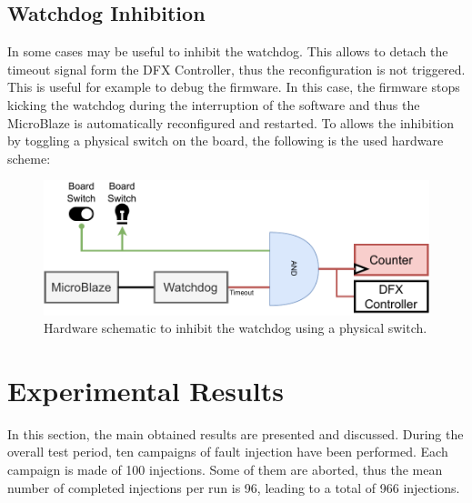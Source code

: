 \subsection{Watchdog Inhibition}
In some cases may be useful to inhibit the watchdog. This allows to detach the timeout signal form the DFX Controller, thus the reconfiguration is not triggered. This is useful for example to debug the firmware. In this case, the firmware stops kicking the watchdog during the interruption of the software and thus the MicroBlaze is automatically reconfigured and restarted. To allows the inhibition by toggling a physical switch on the board, the following is the used hardware scheme:

\begin{figure}[H]
\centering
\includegraphics[width=0.95\linewidth]{images/chapter5/btn.pdf}
\caption{Hardware schematic to inhibit the watchdog using a physical switch.}
\end{figure}



\section{Experimental Results}

In this section, the main obtained results are presented and discussed. During the overall test period, ten campaigns of fault injection have been performed. Each campaign is made of 100 injections. Some of them are aborted, thus the mean number of completed injections per run is 96, leading to a total of 966 injections. \bigskip

